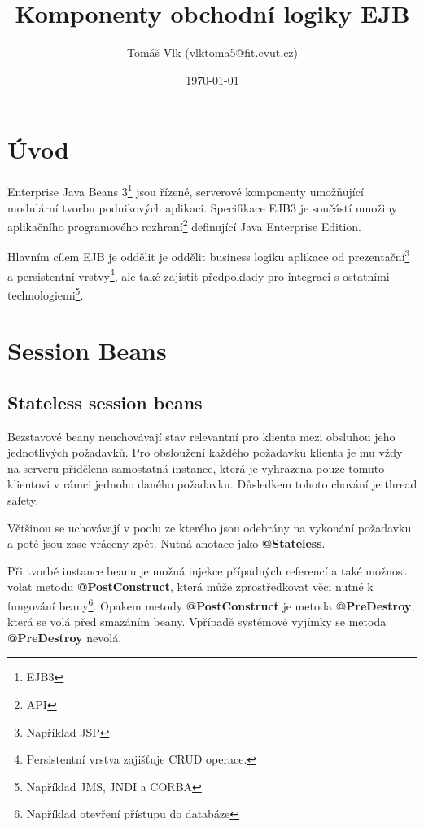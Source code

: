 \documentclass{article}
\title{Komponenty obchodní logiky EJB\vspace{-1em}}
\author{Tomáš Vlk (vlktoma5@fit.cvut.cz)}
\date{\today}
\begin{document}
\maketitle

\section*{Úvod}

Enterprise Java Beans 3\footnote{EJB3} jsou řízené, serverové komponenty umožňující modulární tvorbu podnikových aplikací. Specifikace EJB3 je součástí množiny aplikačního programového rozhraní\footnote{API} definující Java Enterprise Edition.\par

Hlavním cílem EJB je oddělit je oddělit business logiku aplikace od prezentační\footnote{Například JSP} a persistentní vrstvy\footnote{Persistentní vrstva zajišťuje CRUD operace.}, ale také zajistit předpoklady pro integraci s ostatními technologiemi\footnote{Například JMS, JNDI a CORBA}.

\section*{Session Beans}

\subsection*{Stateless session beans}

Bezstavové beany neuchovávají stav relevantní pro klienta mezi obsluhou jeho jednotlivých požadavků. Pro obsloužení každého požadavku klienta je mu vždy na serveru přidělena samostatná instance, která je vyhrazena pouze tomuto klientovi v rámci jednoho daného požadavku. Důsledkem tohoto chování je thread safety.\par

Většinou se uchovávají v poolu ze kterého jsou odebrány na vykonání požadavku a poté jsou zase vráceny zpět. Nutná anotace jako \textbf{@Stateless}.\par

Při tvorbě instance beanu je možná injekce případných referencí a také možnost volat metodu \textbf{@PostConstruct}, která může zprostředkovat věci nutné k fungování beany\footnote{Například otevření přístupu do databáze}. Opakem metody \textbf{@PostConstruct} je metoda \textbf{@PreDestroy}, která se volá před smazáním beany. Vpřípadě systémové vyjímky se metoda \textbf{@PreDestroy} nevolá.
\end{document}
